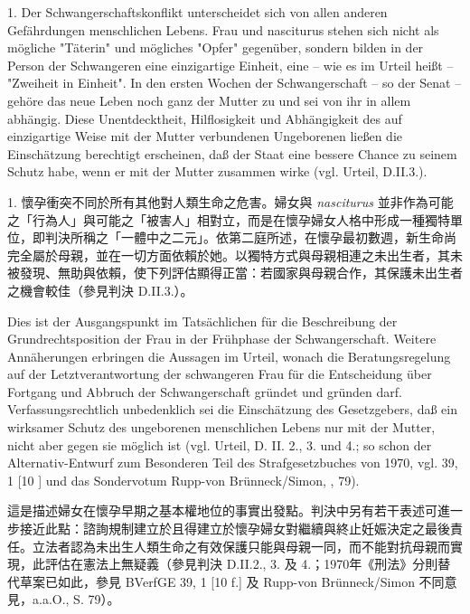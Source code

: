 \documentclass[12pt]{article}
\begin{document}
\begin{sourcepara}[title={原文SondervotumMS.274}]
1. Der Schwangerschaftskonflikt unterscheidet sich von allen anderen Gefährdungen menschlichen Lebens. Frau und nasciturus stehen sich nicht als mögliche "Täterin" und mögliches "Opfer" gegenüber, sondern bilden in der Person der Schwangeren eine einzigartige Einheit, eine -- wie es im Urteil heißt -- "Zweiheit in Einheit". In den ersten Wochen der Schwangerschaft -- so der Senat -- gehöre das neue Leben noch ganz der Mutter zu und sei von ihr in allem abhängig. Diese Unentdecktheit, Hilflosigkeit und Abhängigkeit des auf einzigartige Weise mit der Mutter verbundenen Ungeborenen ließen die Einschätzung berechtigt erscheinen, daß der Staat eine bessere Chance zu seinem Schutz habe, wenn er mit der Mutter zusammen wirke (vgl. Urteil, D.II.3.).
\end{sourcepara}
\begin{transpara}
1. 懷孕衝突不同於所有其他對人類生命之危害。婦女與 \textit{nasciturus} 並非作為可能之「行為人」與可能之「被害人」相對立，而是在懷孕婦女人格中形成一種獨特單位，即判決所稱之「一體中之二元」。依第二庭所述，在懷孕最初數週，新生命尚完全屬於母親，並在一切方面依賴於她。以獨特方式與母親相連之未出生者，其未被發現、無助與依賴，使下列評估顯得正當：若國家與母親合作，其保護未出生者之機會較佳（參見判決 D.II.3.）。
\end{transpara}

\begin{sourcepara}[title={原文SondervotumMS.275}]
Dies ist der Ausgangspunkt im Tatsächlichen für die Beschreibung der Grundrechtsposition der Frau in der Frühphase der Schwangerschaft. Weitere Annäherungen erbringen die Aussagen im Urteil, wonach die Beratungsregelung auf der Letztverantwortung der schwangeren Frau für die Entscheidung über Fortgang und Abbruch der Schwangerschaft gründet und gründen darf. Verfassungsrechtlich unbedenklich sei die Einschätzung des Gesetzgebers, daß ein wirksamer Schutz des ungeborenen menschlichen Lebens nur mit der Mutter, nicht aber gegen sie möglich ist (vgl. Urteil, D. II. 2., 3. und 4.; so schon der Alternativ-Entwurf zum Besonderen Teil des Strafgesetzbuches von 1970, vgl. \abbrBVerfGE{} 39, 1 [10 \abbrF{}] und das Sondervotum Rupp-von Brünneck/Simon, \abbrAAO{}, \abbrS{} 79).
\end{sourcepara}
\begin{transpara}
這是描述婦女在懷孕早期之基本權地位的事實出發點。判決中另有若干表述可進一步接近此點：諮詢規制建立於且得建立於懷孕婦女對繼續與終止妊娠決定之最後責任。立法者認為未出生人類生命之有效保護只能與母親一同，而不能對抗母親而實現，此評估在憲法上無疑義（參見判決 D.II.2., 3. 及 4.；1970年《刑法》分則替代草案已如此，參見 BVerfGE 39, 1 [10 f.] 及 Rupp-von Brünneck/Simon 不同意見，a.a.O., S. 79）。
\end{transpara}
\end{document}
